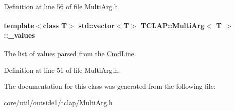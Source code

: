 Definition at line 56 of file Multi\+Arg.\+h.

\paragraph[{\texorpdfstring{\+\_\+values}{_values}}]{\setlength{\rightskip}{0pt plus 5cm}template$<$class T$>$ std\+::vector$<$T$>$ {\bf T\+C\+L\+A\+P\+::\+Multi\+Arg}$<$ T $>$\+::\+\_\+values\hspace{0.3cm}{\ttfamily [protected]}}\hypertarget{classTCLAP_1_1MultiArg_aabcab153e09608343713a6ffef431783}{}\label{classTCLAP_1_1MultiArg_aabcab153e09608343713a6ffef431783}
The list of values parsed from the \hyperlink{classTCLAP_1_1CmdLine}{Cmd\+Line}. 

Definition at line 51 of file Multi\+Arg.\+h.



The documentation for this class was generated from the following file\+:\begin{DoxyCompactItemize}
\item 
core/util/outside1/tclap/Multi\+Arg.\+h\end{DoxyCompactItemize}
